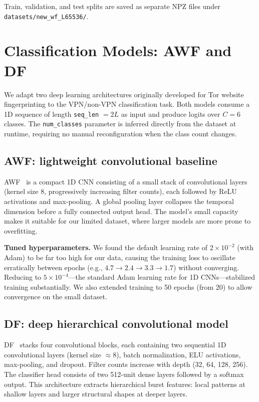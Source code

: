 \documentclass[letterpaper,twocolumn,10pt]{article}
\begin{document}
Train, validation, and test splits are saved as separate NPZ files under \texttt{datasets/new\_wf\_L65536/}.

\section{Classification Models: AWF and DF}

We adapt two deep learning architectures originally developed for Tor website fingerprinting to the VPN/non-VPN classification task. Both models consume a 1D sequence of length \texttt{seq\_len} $= 2L$ as input and produce logits over $C = 6$ classes. The \texttt{num\_classes} parameter is inferred directly from the dataset at runtime, requiring no manual reconfiguration when the class count changes.

\subsection{AWF: lightweight convolutional baseline}
AWF~\cite{awf} is a compact 1D CNN consisting of a small stack of convolutional layers (kernel size 8, progressively increasing filter counts), each followed by ReLU activations and max-pooling. A global pooling layer collapses the temporal dimension before a fully connected output head. The model's small capacity makes it suitable for our limited dataset, where larger models are more prone to overfitting.

\textbf{Tuned hyperparameters.} We found the default learning rate of $2 \times 10^{-2}$ (with Adam) to be far too high for our data, causing the training loss to oscillate erratically between epochs (e.g., $4.7 \rightarrow 2.4 \rightarrow 3.3 \rightarrow 1.7$) without converging. Reducing to $5 \times 10^{-4}$---the standard Adam learning rate for 1D CNNs---stabilized training substantially. We also extended training to 50 epochs (from 20) to allow convergence on the small dataset.

\subsection{DF: deep hierarchical convolutional model}
DF~\cite{df} stacks four convolutional blocks, each containing two sequential 1D convolutional layers (kernel size $\approx 8$), batch normalization, ELU activations, max-pooling, and dropout. Filter counts increase with depth (32, 64, 128, 256). The classifier head consists of two 512-unit dense layers followed by a softmax output. This architecture extracts hierarchical burst features: local patterns at shallow layers and larger structural shapes at deeper layers.
\end{document}
